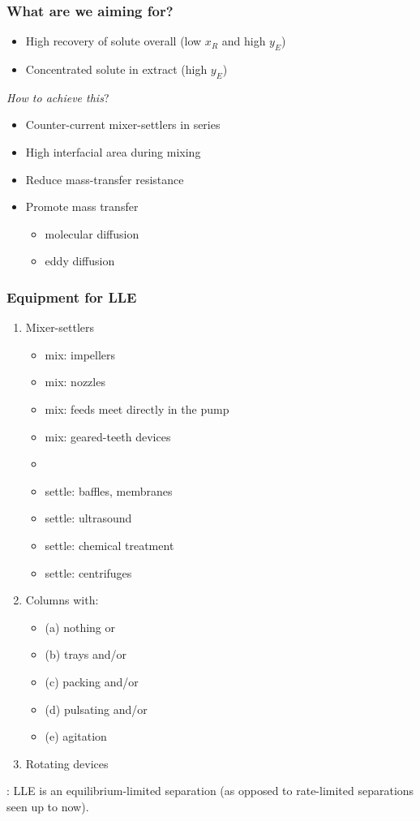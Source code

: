 \begin{frame}\frametitle{What are we aiming for?}
	\begin{exampleblock}{{\color{myRed}{Main aims}}}
		\begin{itemize}
			\item	High recovery of solute overall (low $x_R$ and high $y_E$)
			\item	Concentrated solute in extract (high $y_E$)
		\end{itemize}
	\end{exampleblock}
	\vspace{12pt}
	\emph{How to achieve this}?
	\begin{itemize}
		\item	Counter-current mixer-settlers in series
		\item	High interfacial area during mixing
		\item	Reduce mass-transfer resistance
		\item	Promote mass transfer
		\begin{itemize}
			\item	molecular diffusion
			\item	eddy diffusion  \hfill {\color{myOrange}{$\leftarrow$ orders of magnitude greater}}
		\end{itemize}
	\end{itemize}
\end{frame}

\begin{frame}\frametitle{Equipment for LLE}	
	\begin{enumerate}
		\item	Mixer-settlers
		\begin{itemize}
			\item	mix: impellers
			\item	mix: nozzles
			\item	mix: feeds meet directly in the pump
			\item	mix: geared-teeth devices
			\item	{\color{myOrange}{main aim: good contact; avoid droplets smaller than 2 \micron}}
			\item	settle: baffles, membranes
			\item	settle: ultrasound
			\item	settle: chemical treatment
			\item	settle: centrifuges
		\end{itemize}
		\item	Columns with:
			\begin{itemize}
				\item	(a) nothing or
				\item	(b) trays and/or
				\item	(c) packing and/or
				\item	(d) pulsating and/or
				\item	(e) agitation
			\end{itemize}
		\item	Rotating devices
	\end{enumerate}
	{\color{myRed}{Important point}}: LLE is an equilibrium-limited separation (as opposed to rate-limited separations seen up to now).
\end{frame}

